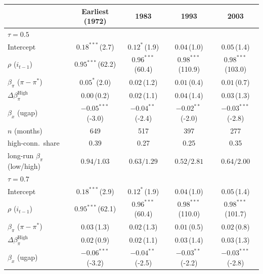 \setlength{\tabcolsep}{4pt}\scriptsize
\begin{tabular}{lcccc}
\toprule
 & Earliest (1972) & 1983 & 1993 & 2003 \\
\midrule
\multicolumn{5}{l}{\textit{$\tau=0.5$}} \\
Intercept & $0.18^{***}$\,{\scriptsize(2.7)} & $0.12^{*}$\,{\scriptsize(1.9)} & $0.04$\,{\scriptsize(1.0)} & $0.05$\,{\scriptsize(1.4)} \\
$\rho$ ($i_{t-1}$) & $0.95^{***}$\,{\scriptsize(62.2)} & $0.96^{***}$\,{\scriptsize(60.4)} & $0.98^{***}$\,{\scriptsize(110.9)} & $0.98^{***}$\,{\scriptsize(103.0)} \\
$\beta_\pi$ ($\pi-\pi^*$) & $0.05^{*}$\,{\scriptsize(2.0)} & $0.02$\,{\scriptsize(1.2)} & $0.01$\,{\scriptsize(0.4)} & $0.01$\,{\scriptsize(0.7)} \\
$\Delta\beta_\pi^{\text{High}}$ & $0.00$\,{\scriptsize(0.2)} & $0.02$\,{\scriptsize(1.1)} & $0.04$\,{\scriptsize(1.4)} & $0.03$\,{\scriptsize(1.3)} \\
$\beta_x$ (ugap) & $-0.05^{***}$\,{\scriptsize(-3.0)} & $-0.04^{**}$\,{\scriptsize(-2.4)} & $-0.02^{**}$\,{\scriptsize(-2.0)} & $-0.03^{***}$\,{\scriptsize(-2.8)} \\
\addlinespace
$n$ (months) & 649 & 517 & 397 & 277 \\
high-conn.\ share & 0.39 & 0.27 & 0.25 & 0.35 \\
long-run $\beta_\pi$ (low/high) & $0.94/1.03$ & $0.63/1.29$ & $0.52/2.81$ & $0.64/2.00$ \\
\midrule
\multicolumn{5}{l}{\textit{$\tau=0.7$}} \\
Intercept & $0.18^{***}$\,{\scriptsize(2.9)} & $0.12^{*}$\,{\scriptsize(1.9)} & $0.04$\,{\scriptsize(1.0)} & $0.05$\,{\scriptsize(1.4)} \\
$\rho$ ($i_{t-1}$) & $0.95^{***}$\,{\scriptsize(62.1)} & $0.96^{***}$\,{\scriptsize(60.4)} & $0.98^{***}$\,{\scriptsize(110.0)} & $0.98^{***}$\,{\scriptsize(101.7)} \\
$\beta_\pi$ ($\pi-\pi^*$) & $0.03$\,{\scriptsize(1.3)} & $0.02$\,{\scriptsize(1.3)} & $0.01$\,{\scriptsize(0.5)} & $0.02$\,{\scriptsize(0.8)} \\
$\Delta\beta_\pi^{\text{High}}$ & $0.02$\,{\scriptsize(0.9)} & $0.02$\,{\scriptsize(1.1)} & $0.03$\,{\scriptsize(1.4)} & $0.03$\,{\scriptsize(1.3)} \\
$\beta_x$ (ugap) & $-0.06^{***}$\,{\scriptsize(-3.2)} & $-0.04^{**}$\,{\scriptsize(-2.5)} & $-0.03^{**}$\,{\scriptsize(-2.2)} & $-0.03^{***}$\,{\scriptsize(-2.8)} \\

\end{tabular}
